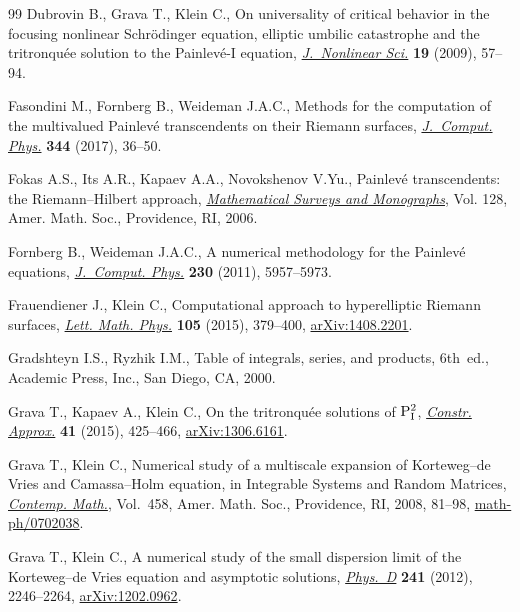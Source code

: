 \documentclass[pdftex]{sigma}
\begin{document}
\begin{thebibliography}{99}
Dubrovin B., Grava T., Klein C., On universality of critical behavior in the
 focusing nonlinear {S}chr\"odinger equation, elliptic umbilic catastrophe and
 the tritronqu\'ee solution to the {P}ainlev\'e-{I} equation,
 \href{https://doi.org/10.1007/s00332-008-9025-y}{\textit{J.~Nonlinear Sci.}} \textbf{19} (2009), 57--94.

Fasondini M., Fornberg B., Weideman J.A.C., Methods for the computation of the
 multivalued {P}ainlev\'e transcendents on their {R}iemann surfaces,
 \href{https://doi.org/10.1016/j.jcp.2017.04.071}{\textit{J.~Comput. Phys.}} \textbf{344} (2017), 36--50.

Fokas A.S., Its A.R., Kapaev A.A., Novokshenov V.Yu., Painlev\'e transcendents:
 the Riemann--Hilbert approach, \href{https://doi.org/10.1090/surv/128}{\textit{Mathematical Surveys and Monographs}},
 Vol. 128, Amer. Math. Soc., Providence, RI, 2006.

Fornberg B., Weideman J.A.C., A numerical methodology for the {P}ainlev\'e
 equations, \href{https://doi.org/10.1016/j.jcp.2011.04.007}{\textit{J.~Comput. Phys.}} \textbf{230} (2011), 5957--5973.

Frauendiener J., Klein C., Computational approach to hyperelliptic {R}iemann
 surfaces, \href{https://doi.org/10.1007/s11005-015-0743-4}{\textit{Lett. Math. Phys.}} \textbf{105} (2015), 379--400,
 \href{https://arxiv.org/abs/1408.2201}{arXiv:1408.2201}.

Gradshteyn I.S., Ryzhik I.M., Table of integrals, series, and products, 6th~ed., Academic Press, Inc., San Diego, CA, 2000.

Grava T., Kapaev A., Klein C., On the tritronqu\'ee solutions of {${\rm P}_{\rm
 I}^2$}, \href{https://doi.org/10.1007/s00365-015-9285-3}{\textit{Constr. Approx.}} \textbf{41} (2015), 425--466,
 \href{https://arxiv.org/abs/1306.6161}{arXiv:1306.6161}.

Grava T., Klein C., Numerical study of a multiscale expansion of {K}orteweg--de
 {V}ries and {C}amassa--{H}olm equation, in Integrable Systems and Random
 Matrices, \href{https://doi.org/10.1090/conm/458/08931}{\textit{Contemp. Math.}}, Vol.~458, Amer. Math. Soc., Providence,
 RI, 2008, 81--98, \href{https://arxiv.org/abs/math-ph/0702038}{math-ph/0702038}.

Grava T., Klein C., A numerical study of the small dispersion limit of the
 {K}orteweg--de {V}ries equation and asymptotic solutions, \href{https://doi.org/10.1016/j.physd.2012.04.001}{\textit{Phys.~D}}
 \textbf{241} (2012), 2246--2264, \href{https://arxiv.org/abs/1202.0962}{arXiv:1202.0962}.


\end{thebibliography}
\end{document}
